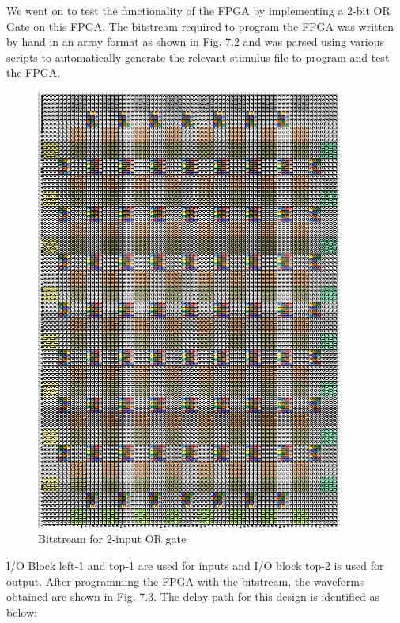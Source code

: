 We went on to test the functionality of the FPGA by implementing a 2-bit OR Gate on this FPGA. The bitstream required to program the FPGA was written by hand in an array format as shown in Fig. 7.2 and was parsed using various scripts to automatically generate the relevant stimulus file to program and test the FPGA.

\begin{figure}
\centering
\includegraphics[width=0.9\textwidth]{fpga_bitstream.png}
\caption{Bitstream for 2-input OR gate}
\label{fig:Figure}
\end{figure}

I/O Block left-1 and top-1 are used for inputs and I/O block top-2 is used for output. After programming the FPGA with the bitstream, the waveforms obtained are shown in Fig. 7.3. The delay path for this design is identified as below:

